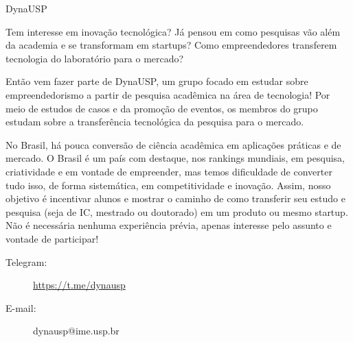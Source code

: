\begin{subsecao}{DynaUSP}


Tem interesse em inovação tecnológica? Já pensou em como pesquisas
vão além da academia e se transformam em startups? Como empreendedores
transferem tecnologia do laboratório para o mercado? 

Então vem fazer parte de DynaUSP, um grupo focado em estudar sobre
empreendedorismo a partir de pesquisa acadêmica na área de tecnologia!
Por meio de estudos de casos e da promoção de eventos, os membros do grupo
estudam sobre a transferência tecnológica da pesquisa para o mercado.

No Brasil, há pouca conversão de ciência acadêmica em aplicações práticas e
de mercado. O Brasil é um país com destaque, nos rankings mundiais, em pesquisa,
criatividade e em vontade de empreender, mas temos dificuldade de converter tudo
isso, de forma sistemática, em competitividade e inovação. Assim, nosso objetivo
é incentivar alunos e mostrar o caminho de como transferir seu estudo e pesquisa
(seja de IC, mestrado ou doutorado) em um produto ou mesmo startup.  Não é
necessária nenhuma experiência prévia, apenas interesse pelo assunto e vontade
de participar!

\begin{description}
  \item[Telegram:] \url{https://t.me/dynausp}
  \item[E-mail:] dynausp@ime.usp.br
\end{description}

\end{subsecao}

